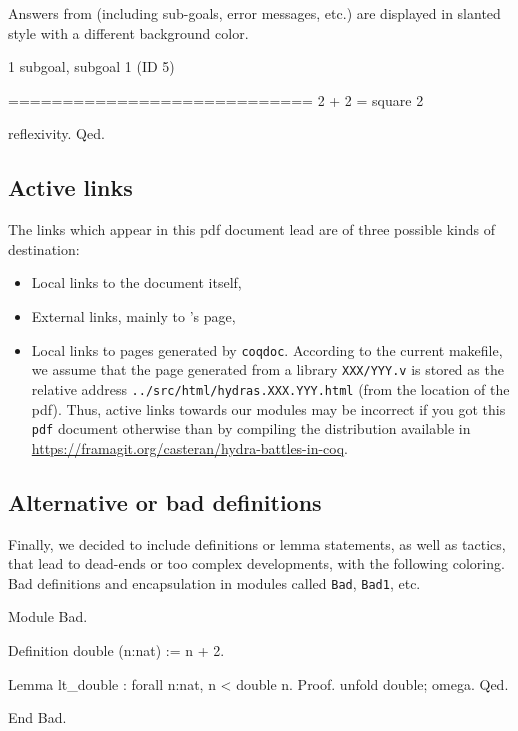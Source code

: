 \documentclass[a4paper]{book}
\begin{document}
Answers from \coq{} (including sub-goals, error messages, etc.) are displayed in slanted style
with a different background color.



 \begin{Coqanswer}
 1 subgoal, subgoal 1 (ID 5)
  
  ============================
   2 + 2 = square 2
   
 \end{Coqanswer}

 \begin{Coqsrc}
   reflexivity.
Qed.
 \end{Coqsrc}


\subsection{Active links}
The  links which appear in this pdf  document lead are of three possible kinds of destination:
\begin{itemize}
\item Local links to the document itself,
\item External links, mainly to \coq's page,
\item Local links to pages generated by \texttt{coqdoc}. According to the current makefile,
  we assume that the page generated from a library \texttt{XXX/YYY.v} is stored as
the relative address \texttt{../src/html/hydras.XXX.YYY.html} (from the location of the pdf).
Thus,  active links towards our \coq{} modules may be incorrect if you got this \texttt{pdf} document otherwise than by compiling the distribution available in
\url{https://framagit.org/casteran/hydra-battles-in-coq}.

\end{itemize}

\subsection{Alternative or bad definitions}
\label{sect:alt-proofs}
Finally, we decided to include definitions or lemma statements, as well as tactics,  that lead to
dead-ends or too complex developments, with the following coloring.
Bad definitions 
 and encapsulation in modules called \texttt{Bad}, \texttt{Bad1}, etc.


\begin{Coqbad}
Module Bad.

Definition double (n:nat)  := n + 2.
 
Lemma lt_double : forall n:nat, n < double  n.
Proof.
   unfold double; omega.
Qed.

End Bad.
\end{Coqbad}
\end{document}
